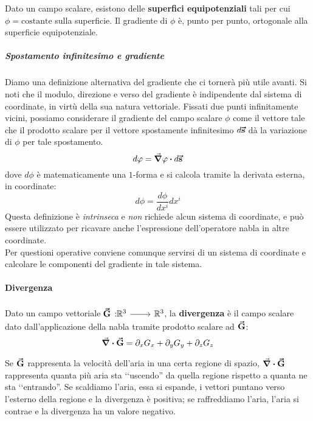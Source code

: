 \begin{observe}
	Dato un campo scalare, esistono delle \textbf{superfici equipotenziali} tali per cui $\phi=\text{costante}$ sulla superficie. Il gradiente di $\phi$ è, punto per punto, ortogonale alla superficie equipotenziale.
\end{observe}
\subparagraph{Spostamento infinitesimo e gradiente}
Diamo una definizione alternativa del gradiente che ci tornerà più utile avanti. Si noti che il modulo, direzione e verso del gradiente è indipendente dal sistema di coordinate, in virtù della sua natura vettoriale. Fissati due punti infinitamente vicini, possiamo considerare il gradiente del campo scalare $\phi$ come il vettore tale che il prodotto scalare per il vettore spostamente infinitesimo $d\vb*{\va{s}}$ dà la variazione di $\phi$ per tale spostamento.
\begin{equation}
	d\phi=\grad{\phi}\vdot d\vba{s}\label{gradienteintrinseco}
\end{equation}
dove $d\phi$ è matematicamente una $1$-forma e si calcola tramite la derivata esterna, in coordinate:
\begin{equation}
	d\phi=\frac{d\phi}{dx^i}dx^i
\end{equation}
Questa definizione è \textit{intrinseca} e \textit{non} richiede alcun sistema di coordinate, e può essere utilizzato per ricavare anche l'espressione dell'operatore nabla in altre coordinate.\\
Per questioni operative conviene comunque servirsi di un sistema di coordinate e calcolare le componenti del gradiente in tale sistema.
\paragraph{Divergenza}
\begin{define}[Divergenza]
	Dato un campo vettoriale $\funz[\vba{G}]{\realset^3}{\realset^3}$, la \textbf{divergenza} è il campo scalare dato dall'applicazione della nabla tramite prodotto scalare ad $\vb*{\va{G}}$:
	\begin{equation}
		\div{\vb*{\va{G}}}=\partial_xG_x+\partial_yG_y+\partial_zG_z
	\end{equation}
\end{define}
\begin{example}
	Se $\vb*{\va{G}}$ rappresenta la velocità dell'aria in una certa regione di spazio, $\div{ \vb*{\va{G}}}$ rappresenta quanta più aria sta ‘‘uscendo'' da quella regione rispetto a quanta ne sta ‘‘entrando''. Se scaldiamo l'aria, essa si espande, i vettori puntano verso l'esterno della regione e la divergenza è positiva; se raffreddiamo l'aria, l'aria si contrae e la divergenza ha un valore negativo.
\end{example}
